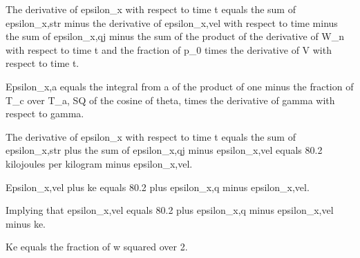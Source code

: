 The derivative of epsilon_x with respect to time t equals the sum of epsilon_x,str minus the derivative of epsilon_x,vel with respect to time minus the sum of epsilon_x,qj minus the sum of the product of the derivative of W_n with respect to time t and the fraction of p_0 times the derivative of V with respect to time t.

Epsilon_x,a equals the integral from a of the product of one minus the fraction of T_c over T_a, SQ of the cosine of theta, times the derivative of gamma with respect to gamma.

The derivative of epsilon_x with respect to time t equals the sum of epsilon_x,str plus the sum of epsilon_x,qj minus epsilon_x,vel equals 80.2 kilojoules per kilogram minus epsilon_x,vel.

Epsilon_x,vel plus ke equals 80.2 plus epsilon_x,q minus epsilon_x,vel.

Implying that epsilon_x,vel equals 80.2 plus epsilon_x,q minus epsilon_x,vel minus ke.

Ke equals the fraction of w squared over 2.